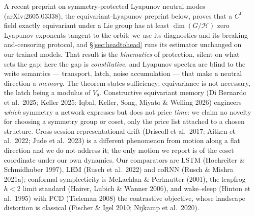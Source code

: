 \documentclass{article}
\begin{document}
A recent preprint on symmetry-protected Lyapunov neutral modes (arXiv:2605.03338), the equivariant-Lyapunov preprint below, proves that a $C^1$ field exactly equivariant under a Lie group has at least $\dim(G/\mathcal H)$ zero Lyapunov exponents tangent to the orbit; we use its diagnostics and its breaking-and-censoring protocol, and \S\ref{sec:headtohead} runs its estimator unchanged on our trained models. That result is the \emph{kinematics} of protection, silent on what sets the gap; here the gap is \emph{constitutive}, and Lyapunov spectra are blind to the write semantics --- transport, latch, noise accumulation --- that make a neutral direction a \emph{memory}. The theorem states sufficiency; equivariance is not necessary, the latch being a modulus of $V_\theta$. Constructive equivariant memory (Di Bernardo et al.\ 2025; Keller 2025; Iqbal, Keller, Song, Miyato \& Welling 2026) engineers \emph{which} symmetry a network expresses but does not price \emph{time}: we claim no novelty for choosing a symmetry group or coset, only the price list attached to a chosen structure. Cross-session representational drift (Driscoll et al.\ 2017; Aitken et al.\ 2022; Jude et al.\ 2023) is a different phenomenon from motion along a flat direction and we do not address it; the only motion we report is of the coset coordinate under our own dynamics. Our comparators are LSTM (Hochreiter \& Schmidhuber 1997), LEM (Rusch et al.\ 2022) and coRNN (Rusch \& Mishra 2021a); conformal symplecticity is McLachlan \& Perlmutter (2001), the leapfrog $h<2$ limit standard (Hairer, Lubich \& Wanner 2006), and wake--sleep (Hinton et al.\ 1995) with PCD (Tieleman 2008) the contrastive objective, whose landscape distortion is classical (Fischer \& Igel 2010; Nijkamp et al.\ 2020).
\end{document}
